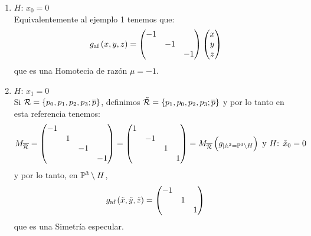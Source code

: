 \begin{example}
\begin{enumerate}
            \begin{enumerate}
                \item $H$: $x_0=0$\\
                Equivalentemente al ejemplo 1 tenemos que:
                \[
                g_\text{af}\left( x,y,z \right) =
                \begin{pmatrix}
                -1 & &\\
                & -1 &\\
                & & -1\\
                \end{pmatrix}
                \begin{pmatrix}
                x\\
                y\\
                z\\
                \end{pmatrix}
                \]
                que es una Homotecia de razón $\mu = -1$. 
                \item $H$: $x_1=0$\\
                 Si $\mathcal{R} = \{p_0, p_1, p_2, p_3; \overline{p} \}$, definimos $\tilde{\mathcal{R}}=\{p_1, p_0, p_2, p_3; \overline{p} \}$ y por lo tanto en esta referencia tenemos:
                 \[
                    M_{\overline{\mathcal{R}}} =
                    \begin{pmatrix}
                    -1 & & &\\
                    & 1 & &\\
                    & & -1 &\\
                    & & & -1\\
                    \end{pmatrix} =
                    \begin{pmatrix}
                    1 & & &\\
                    & -1 & &\\
                    & & 1 &\\
                    & & & 1\\
                    \end{pmatrix} = M_{\overline{\mathcal{R}}} \left( g_{|\mathbb{A}^3 = \mathbb{P}^3\setminus H}\right)
                    \text{ y }
                    H\text{: }\tilde{x}_0 = 0
                \]
                y por lo tanto, en $\mathbb{P}^3\setminus H$,
                \[
                g_\text{af} \left( \tilde{x},\tilde{y},\tilde{z} \right) =
                \begin{pmatrix}
                    -1 & &\\
                    & 1 &\\
                    & & 1\\
                \end{pmatrix}
                \]
                que es una Simetría especular.
            \end{enumerate}
        \end{enumerate}
    \end{example}
    

